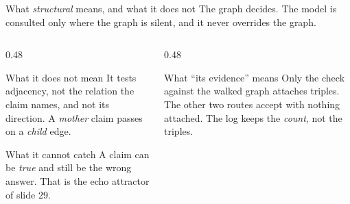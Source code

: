 \begin{frame}{What \emph{structural} means, and what it does not}
  \bodyshift{-2pt}
  The graph decides. The model is consulted only where the graph is
  silent, and it never overrides the graph.
  \vspace{2mm}
  \begin{columns}[T]
    \begin{column}{0.48\textwidth}
      \begin{block}{What it does not mean}
        It tests \alert{adjacency}, not the relation the claim names, and
        not its direction. A \emph{mother} claim passes on a \emph{child}
        edge.
      \end{block}
      \vspace{2mm}
      \begin{block}{What it cannot catch}
        \agrraggedright
        A claim can be \emph{true} and still be the wrong answer. That is
        the echo attractor of slide 29.
      \end{block}
    \end{column}
    \begin{column}{0.48\textwidth}
      \begin{block}{What ``its evidence'' means}
        Only the check against the \alert{walked} graph attaches triples.
        The other two routes accept with nothing attached. The log keeps
        the \emph{count}, not the triples.
      \end{block}
    \end{column}
  \end{columns}
  \centrebody
\end{frame}

